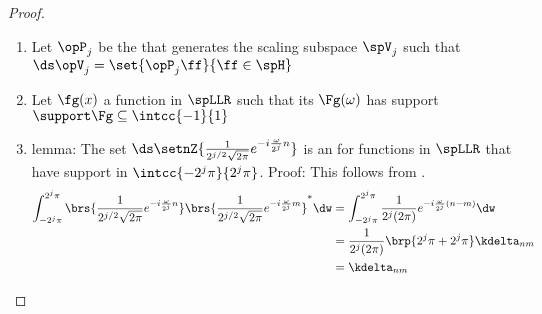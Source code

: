 \begin{proof}
\begin{enumerate}
  \item Let $\opP_j$ be the  that generates the scaling subspace $\spV_j$ such that \label{item:oms_phi1_Pj}
    \\\indentx$\ds\opV_j=\set{\opP_j\ff}{\ff\in\spH}$

  \item Let $\fg(x)$ a function in $\spLLR$ such that its   $\Fg(\omega)$
        has support $\support\Fg\subseteq\intcc{-1}{1}$ \label{item:oms_phi1_g}

  \item lemma: The set $\ds\setnZ{\frac{1}{2^{j/2}{\sqrt{2\pi}}}e^{-i\frac{\omega}{2^j}n}}$ \label{ilem:oms_phi1_fs}
        is an  for functions in $\spLLR$ that have support in $\intcc{-2^j\pi}{2^j\pi}$.
        Proof: This follows from .
        {\begin{align*}
          \int_{-2^j\pi}^{2^j\pi} \brs{\frac{1}{2^{j/2}\sqrt{2\pi}}e^{-i\frac{\omega}{2^j}n}}
                                  \brs{\frac{1}{2^{j/2}\sqrt{2\pi}}e^{-i\frac{\omega}{2^j}m}}^\ast \dw
            &= \int_{-2^j\pi}^{2^j\pi} \frac{1}{2^{j}(2\pi)}e^{-i\frac{\omega}{2^j}(n-m)} \dw
          \\&= \frac{1}{2^{j}(2\pi)}\brp{2^j\pi+2^j\pi} \kdelta_{nm}
          \\&= \kdelta_{nm}
        \end{align*}}


\end{enumerate}
\end{proof}
